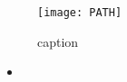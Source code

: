 \documentclass[12pt]{jarticle}
\begin{document}
\begin{titlepage}
    \begin{center}
        {\Large\bf}\\ %
        {\large }\\ %
    \end{center}
\tableofcontents
\end{titlepage}

\begin{figure}[htbp]
    \begin{center}
        \texttt{[image: PATH]}
        \caption{caption}
        \label{}
    \end{center}
\end{figure}
\begin{itemize}
    \item
\end{itemize}
  \begin{thebibliography}{99}
    \bibitem{}
  \end{thebibliography}
\end{document}
